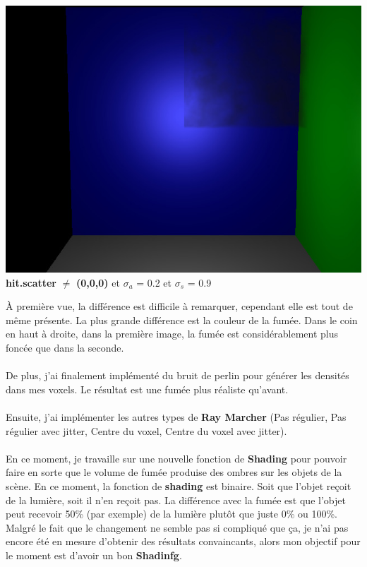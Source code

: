 \documentclass{article}
\begin{document}
\begin{center}
    \includegraphics[scale=0.5]{scatter_abs020_scat090.jpg} \\
    \textbf{hit.scatter} $\neq$ \textbf{(0,0,0)} et $\sigma_a$ = 0.2 et $\sigma_s$ = 0.9
\end{center}
À première vue, la différence est difficile à remarquer, cependant elle est tout de même présente. La plus grande différence est la couleur de la fumée. Dans le coin en haut à droite, dans la première image, la fumée est considérablement plus foncée que dans la seconde. \\\\
De plus, j'ai finalement implémenté du bruit de perlin pour générer les densités dans mes voxels. Le résultat est une fumée plus réaliste qu'avant. \\\\
Ensuite, j'ai implémenter les autres types de \textbf{Ray Marcher} (Pas régulier, Pas régulier avec jitter, Centre du voxel, Centre du voxel avec jitter). \\\\
En ce moment, je travaille sur une nouvelle fonction de \textbf{Shading} pour pouvoir faire en sorte que le volume de fumée produise des ombres sur les objets de la scène. En ce moment, la fonction de \textbf{shading} est binaire. Soit que l'objet reçoit de la lumière, soit il n'en reçoit pas. La différence avec la fumée est que l'objet peut recevoir 50\% (par exemple) de la lumière plutôt que juste 0\% ou 100\%. Malgré le fait que le changement ne semble pas si compliqué que ça, je n'ai pas encore été en mesure d'obtenir des résultats convaincants, alors mon objectif pour le moment est d'avoir un bon \textbf{Shadinfg}.
\end{document}
